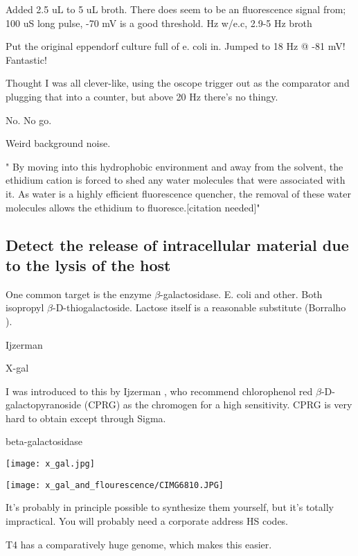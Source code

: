 \documentclass[paper.tex]{subfiles}
\begin{document}
Added 2.5 uL to 5 uL broth. There does seem to be an fluorescence signal from; 100 uS long pulse, -70 mV is a good threshold.
Hz w/e.c, 2.9-5 Hz broth

Put the original eppendorf culture full of e. coli in. Jumped to 18 Hz @ -81 mV! Fantastic!

Thought I was all clever-like, using the oscope trigger out as the comparator and plugging that into a counter,
but above 20 Hz there's no thingy.

No. No go.

Weird background noise.

" By moving into this hydrophobic environment and away from the solvent, the ethidium cation is forced to shed any water molecules that were associated with it. As water is a highly efficient fluorescence quencher, the removal of these water molecules allows the ethidium to fluoresce.[citation needed]"







\subsection{Detect the release of intracellular material due to the lysis of the host}

One common target is the enzyme $\beta$-galactosidase. E. coli and other. Both  isopropyl $\beta$-D-thiogalactoside. Lactose itself is a reasonable substitute (Borralho \cite{Lactose2002}).

Ijzerman

X-gal \cite{Improved}

I was introduced to this by Ijzerman \cite{liquid1993}, who recommend chlorophenol red $\beta$-D-galactopyranoside (CPRG) as the chromogen for a high sensitivity. CPRG is very hard to obtain except through Sigma.



beta-galactosidase



\texttt{[image: x\_gal.jpg]}

\texttt{[image: x\_gal\_and\_flourescence/CIMG6810.JPG]}

 It’s probably in principle possible to synthesize them yourself, but it’s totally impractical. You will probably need a corporate address HS codes. 

T4 has a comparatively huge genome, which makes this easier.
\end{document}
